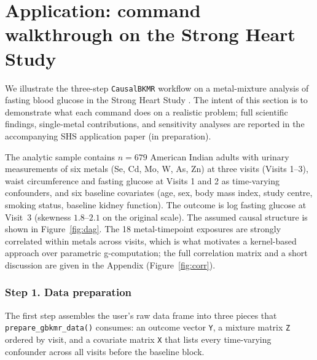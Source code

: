 \documentclass[11pt]{article}
\newcommand{\pkg}[1]{\texttt{#1}}
\newcommand{\code}[1]{\texttt{#1}}
\begin{document}
\section*{Application: command walkthrough on the Strong Heart Study}
\label{sec:application}

We illustrate the three-step \pkg{CausalBKMR} workflow on a metal-mixture analysis of fasting blood glucose in the Strong Heart Study \citep[SHS;][]{shs_lee_1990}. The intent of this section is to demonstrate what each command does on a realistic problem; full scientific findings, single-metal contributions, and sensitivity analyses are reported in the accompanying SHS application paper (in preparation).

The analytic sample contains $n = 679$ American Indian adults with urinary measurements of six metals (Se, Cd, Mo, W, As, Zn) at three visits (Visits 1--3), waist circumference and fasting glucose at Visits 1 and 2 as time-varying confounders, and six baseline covariates (age, sex, body mass index, study centre, smoking status, baseline kidney function). The outcome is log fasting glucose at Visit~3 (skewness $1.8$--$2.1$ on the original scale). The assumed causal structure is shown in Figure~\ref{fig:dag}. The 18 metal-timepoint exposures are strongly correlated within metals across visits, which is what motivates a kernel-based approach over parametric g-computation; the full correlation matrix and a short discussion are given in the Appendix (Figure~\ref{fig:corr}).

\subsubsection*{Step 1. Data preparation}
The first step assembles the user's raw data frame into three pieces that \code{prepare\_gbkmr\_data()} consumes: an outcome vector \code{Y}, a mixture matrix \code{Z} ordered by visit, and a covariate matrix \code{X} that lists every time-varying confounder across all visits before the baseline block.
\end{document}
